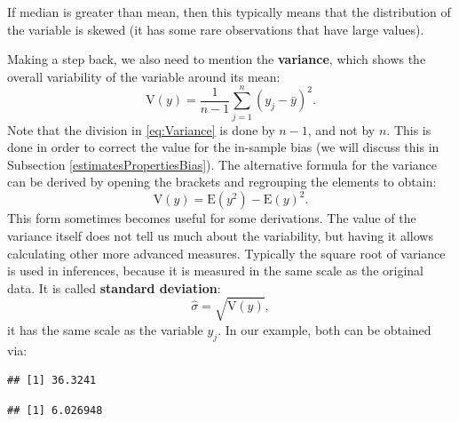\documentclass[
]{book}
\newenvironment{Shaded}{\begin{snugshade}}{\end{snugshade}}
\newcommand{\FunctionTok}[1]{\textcolor[rgb]{0.13,0.29,0.53}{\textbf{#1}}}
\newcommand{\NormalTok}[1]{#1}
\newcommand{\SpecialCharTok}[1]{\textcolor[rgb]{0.81,0.36,0.00}{\textbf{#1}}}
\theoremstyle{definition}
\theoremstyle{definition}
\theoremstyle{definition}
\theoremstyle{definition}
\theoremstyle{remark}
\begin{document}
If median is greater than mean, then this typically means that the distribution of the variable is skewed (it has some rare observations that have large values).

Making a step back, we also need to mention the \textbf{variance}, which shows the overall variability of the variable around its mean:
\begin{equation}
    \mathrm{V}(y)= \frac{1}{n-1}\sum_{j=1}^n (y_j - \bar{y})^2 .
    \label{eq:Variance}
\end{equation}
Note that the division in \eqref{eq:Variance} is done by \(n-1\), and not by \(n\). This is done in order to correct the value for the in-sample bias (we will discuss this in Subsection \ref{estimatesPropertiesBias}). The alternative formula for the variance can be derived by opening the brackets and regrouping the elements to obtain:
\begin{equation}
    \mathrm{V}(y)= \mathrm{E}(y^2) - \mathrm{E}(y)^2.
    \label{eq:VarianceAlt}
\end{equation}
This form sometimes becomes useful for some derivations. The value of the variance itself does not tell us much about the variability, but having it allows calculating other more advanced measures. Typically the square root of variance is used in inferences, because it is measured in the same scale as the original data. It is called \textbf{standard deviation}:
\begin{equation}
    \hat{\sigma} = \sqrt{\mathrm{V}(y)} ,
    \label{eq:StdDev}
\end{equation}
it has the same scale as the variable \(y_j\). In our example, both can be obtained via:

\begin{Shaded}
\end{Shaded}

\begin{verbatim}
## [1] 36.3241
\end{verbatim}

\begin{Shaded}
\end{Shaded}

\begin{verbatim}
## [1] 6.026948
\end{verbatim}
\end{document}
